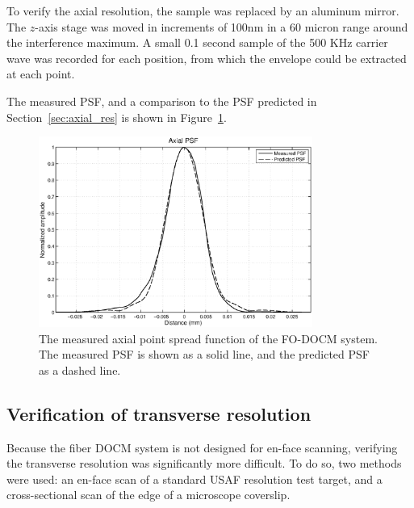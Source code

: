 
To verify the axial resolution, the sample was replaced by an aluminum mirror. The $z$-axis stage was moved in increments of 100nm in a 60 micron range around the interference maximum. A small 0.1 second sample of the 500 KHz carrier wave was recorded for each position, from which the envelope could be extracted at each point.

The measured PSF, and a comparison to the PSF predicted in Section~\ref{sec:axial_res} is shown in Figure~\ref{fig:psf_comparison}.

\begin{figure}[h!]
\centering
\includegraphics[width=0.8\textwidth]{Images/Results/psf-aom2.eps}
\caption[The measured axial point spread function.]{The measured axial point spread function of the FO-DOCM system. The measured PSF is shown as a solid line, and the predicted PSF as a dashed line.\label{fig:psf_comparison}}
\end{figure}

\subsection{Verification of transverse resolution}

Because the fiber DOCM system is not designed for en-face scanning, verifying the transverse resolution was significantly more difficult. To do so, two methods were used: an en-face scan of a standard USAF resolution test target, and a cross-sectional scan of the edge of a microscope coverslip.

